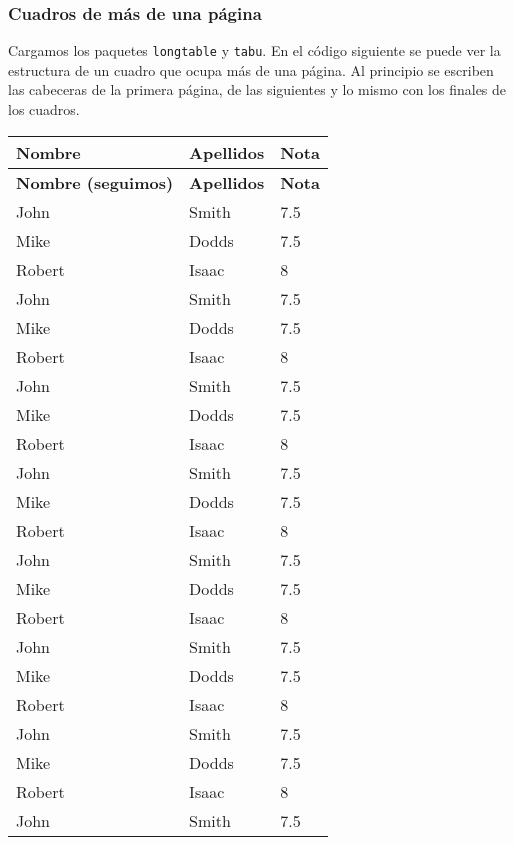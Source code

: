 \documentclass[11pt]{article}
\begin{document}
\subsubsection{Cuadros de más de una
página}

Cargamos los paquetes \texttt{longtable} y \texttt{tabu}. En el código
siguiente se puede ver la estructura de un cuadro que ocupa más de una
página. Al principio se escriben las cabeceras de la primera página, de
las siguientes y lo mismo con los finales de los cuadros.

\begin{center}
\begin{longtabu} to 0.7\linewidth{lll} %
\toprule
\textbf{Nombre} & \textbf{Apellidos} & \textbf{Nota} \\
\midrule
\endfirsthead
\toprule
\textbf{Nombre (seguimos)} & \textbf{Apellidos} & \textbf{Nota} \\
\midrule
\endhead
\midrule
\endfoot
\bottomrule
\endlastfoot
John & Smith & 7.5 \\
Mike & Dodds & 7.5 \\
Robert & Isaac & 8 \\
John & Smith & 7.5 \\
Mike & Dodds & 7.5 \\
Robert & Isaac & 8 \\
John & Smith & 7.5 \\
Mike & Dodds & 7.5 \\
Robert & Isaac & 8 \\
John & Smith & 7.5 \\
Mike & Dodds & 7.5 \\
Robert & Isaac & 8 \\
John & Smith & 7.5 \\
Mike & Dodds & 7.5 \\
Robert & Isaac & 8 \\
John & Smith & 7.5 \\
Mike & Dodds & 7.5 \\
Robert & Isaac & 8 \\
John & Smith & 7.5 \\
Mike & Dodds & 7.5 \\
Robert & Isaac & 8 \\
John & Smith & 7.5 \\

\end{longtabu}
\end{center}
\end{document}
